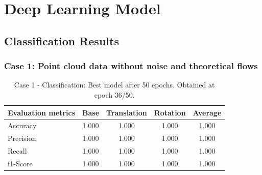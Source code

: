 \section{Deep Learning Model}
\label{sec:DLModel}
\subsection{Classification Results}
\subsubsection{Case 1: Point cloud data without noise and theoretical flows}
\begin{table}[H]
        \begin{center}
                \begin{tabular}{|l||c|c|c|c|}
                        \hline 
                        Evaluation metrics & Base & Translation & Rotation & Average \\
                        \hline \hline
                        Accuracy  & 1.000 & 1.000 &  1.000 &  1.000\\
                        \hline
                        Precision & 1.000 &  1.000 &  1.000 &  1.000\\
                        \hline
                        Recall & 1.000&  1.000& 1.000 & 1.000 \\
                        \hline
                        f1-Score &  1.000&  1.000 & 1.000 & 1.000 \\
                        \hline
                \end{tabular}
        \end{center}
        \caption{Case 1 - Classification: Best model after 50 epochs. Obtained at epoch 36/50.}
\end{table}
